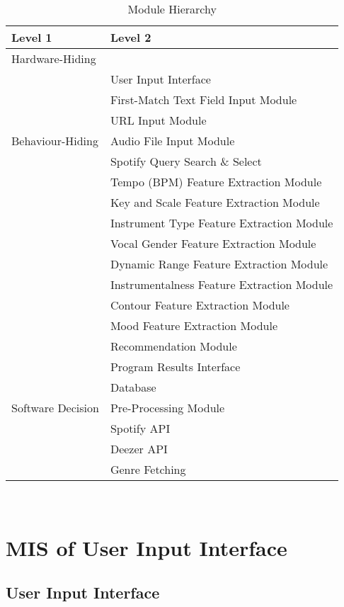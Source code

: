 \documentclass[12pt, titlepage]{article}
\begin{document}
\begin{table}[h!]
\centering
\begin{tabular}{p{} p{}}
\toprule
\textbf{Level 1} & \textbf{Level 2}\\
\midrule

{Hardware-Hiding} & ~ \\
\midrule

\multirow{7}{0.3\textwidth}{Behaviour-Hiding} & User Input Interface\\
& First-Match Text Field Input Module\\
& URL Input Module\\
& Audio File Input Module\\
& Spotify Query Search \& Select\\
& Tempo (BPM) Feature Extraction Module\\
& Key and Scale Feature Extraction Module\\
& Instrument Type Feature Extraction Module\\
& Vocal Gender Feature Extraction Module\\
& Dynamic Range Feature Extraction Module\\
& Instrumentalness Feature Extraction Module\\
& Contour Feature Extraction Module\\
& Mood Feature Extraction Module\\
& Recommendation Module\\
& Program Results Interface\\
\midrule

\multirow{3}{0.3\textwidth}{Software Decision} & Database\\
& Pre-Processing Module\\
& Spotify API\\
& Deezer API\\
& Genre Fetching\\
\bottomrule

\end{tabular}
\caption{Module Hierarchy}
\label{TblMH}
\end{table}

\newpage
~\newpage

\section{MIS of User Input Interface} \label{Module}

\subsection{User Input Interface}
\end{document}
